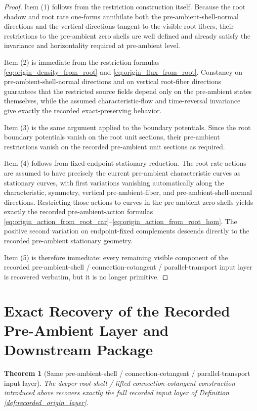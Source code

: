 \documentclass[11pt]{article}
\newtheorem{theorem}{Theorem}
\begin{document}
\begin{proof}
Item (1) follows from the restriction construction itself. Because the root shadow and root rate one-forms annihilate both the pre-ambient-shell-normal directions and the vertical directions tangent to the visible root fibers, their restrictions to the pre-ambient zero shells are well defined and already satisfy the invariance and horizontality required at pre-ambient level.

Item (2) is immediate from the restriction formulas \eqref{eq:origin_density_from_root} and \eqref{eq:origin_flux_from_root}. Constancy on pre-ambient-shell-normal directions and on vertical root-fiber directions guarantees that the restricted source fields depend only on the pre-ambient states themselves, while the assumed characteristic-flow and time-reversal invariance give exactly the recorded exact-preserving behavior.

Item (3) is the same argument applied to the boundary potentials. Since the root boundary potentials vanish on the root unit sections, their pre-ambient restrictions vanish on the recorded pre-ambient unit sections as required.

Item (4) follows from fixed-endpoint stationary reduction. The root rate actions are assumed to have precisely the current pre-ambient characteristic curves as stationary curves, with first variations vanishing automatically along the characteristic, symmetry, vertical pre-ambient-fiber, and pre-ambient-shell-normal directions. Restricting those actions to curves in the pre-ambient zero shells yields exactly the recorded pre-ambient-action formulas \eqref{eq:origin_action_from_root_car}--\eqref{eq:origin_action_from_root_hom}. The positive second variation on endpoint-fixed complements descends directly to the recorded pre-ambient stationary geometry.

Item (5) is therefore immediate: every remaining visible component of the recorded pre-ambient-shell / connection-cotangent / parallel-transport input layer is recovered verbatim, but it is no longer primitive.
\end{proof}

\section{Exact Recovery of the Recorded Pre-Ambient Layer and Downstream Package}

\begin{theorem}[Same pre-ambient-shell / connection-cotangent / parallel-transport input layer]
\label{thm:same_origin_input}
The deeper root-shell / lifted connection-cotangent construction introduced above recovers exactly the full recorded input layer of Definition \ref{def:recorded_origin_layer}.
\end{theorem}
\end{document}
